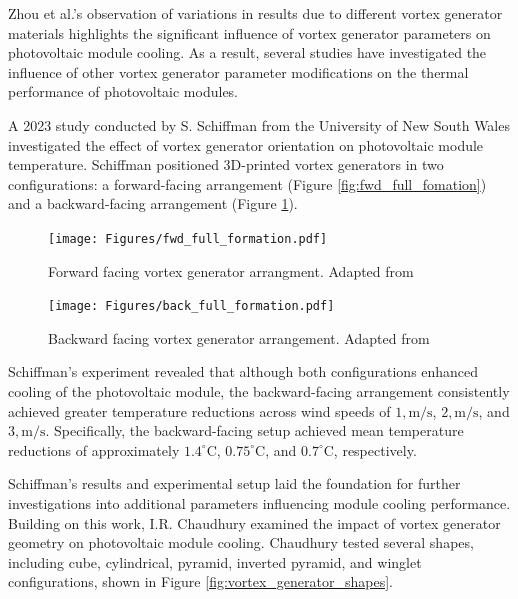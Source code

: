 Zhou et al.'s observation of variations in results due to different vortex generator materials highlights the significant influence of vortex generator parameters on photovoltaic module cooling. \cite{Zhou2024Long-termCooling} As a result, several studies have investigated the influence of other vortex generator parameter modifications on the thermal performance of photovoltaic modules.

A 2023 study conducted by S. Schiffman from the University of New South Wales investigated the effect of vortex generator orientation on photovoltaic module temperature. Schiffman positioned 3D-printed vortex generators in two configurations: a forward-facing arrangement (Figure \ref{fig:fwd_full_fomation}) and a backward-facing arrangement (Figure \ref{fig:back_full_formation}).

\begin{figure}[H]
    \centering
    \begin{minipage}[b]{0.47\linewidth}
        \centering
        \texttt{[image: Figures/fwd\_full\_formation.pdf]}
        \caption{Forward facing vortex generator arrangment. Adapted from \cite{Schiffmann2023AnConditions}}
        \label{fig:fwd_full_fomation}
    \end{minipage}
    \hfill
    \begin{minipage}[b]{0.47\linewidth}
        \centering
        \texttt{[image: Figures/back\_full\_formation.pdf]}
        \caption{Backward facing vortex generator arrangement. Adapted from \cite{Schiffmann2023AnConditions}}
        \label{fig:back_full_formation}
    \end{minipage}
\end{figure}

Schiffman's experiment revealed that although both configurations enhanced cooling of the photovoltaic module, the backward-facing arrangement consistently achieved greater temperature reductions across wind speeds of $1,\text{m/s}$, $2,\text{m/s}$, and $3,\text{m/s}$. Specifically, the backward-facing setup achieved mean temperature reductions of approximately $1.4^\circ\text{C}$, $0.75^\circ\text{C}$, and $0.7^\circ\text{C}$, respectively. \cite{Schiffmann2023AnConditions}

Schiffman's results and experimental setup laid the foundation for further investigations into additional parameters influencing module cooling performance. Building on this work, I.R. Chaudhury examined the impact of vortex generator geometry on photovoltaic module cooling. Chaudhury tested several shapes, including cube, cylindrical, pyramid, inverted pyramid, and winglet configurations, shown in Figure \ref{fig:vortex_generator_shapes}.

